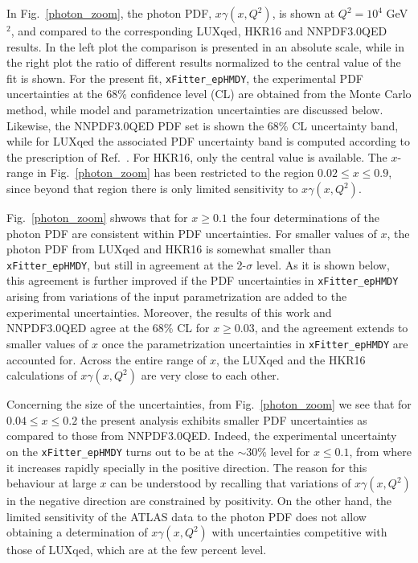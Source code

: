 In Fig.~\ref{photon_zoom}, the photon PDF, $x\gamma(x,Q^2)$, is shown at
$Q^2=10^4$ GeV$^2$,  and compared to the corresponding LUXqed,
HKR16 and NNPDF3.0QED results.
%
In the left plot the comparison is presented in an absolute scale, while
in the right plot the ratio of
different results normalized to
the central value of the fit is shown.
%
For the present fit, {\tt xFitter\_epHMDY}, 
the experimental PDF uncertainties at the 68\% confidence level (CL) are obtained from the Monte Carlo method,
 while model and parametrization uncertainties are discussed below.
Likewise, the  NNPDF3.0QED PDF set is shown the 68\% CL uncertainty band,
while for LUXqed the associated PDF uncertainty band is computed according to the
prescription of Ref.~\cite{Manohar:2016nzj}.
For HKR16, only the central value is available.
%
The $x$-range in Fig.~\ref{photon_zoom} has been restricted to the region
$0.02 \le x \le 0.9$, since beyond that region there is only limited sensitivity to $x\gamma(x,Q^2)$.

Fig.~\ref{photon_zoom} shwows that for $x\ge 0.1$ the four determinations of
the photon PDF are consistent within PDF uncertainties.
%
For smaller values of $x$, the photon PDF from LUXqed and HKR16 is somewhat smaller than {\tt xFitter\_epHMDY},
but still in agreement at the 2-$\sigma$ level.
%
As it is shown below, this agreement is further improved if the PDF uncertainties in
{\tt xFitter\_epHMDY}
arising from variations of the input parametrization are added to the experimental
uncertainties.
%
Moreover, the results of this work and NNPDF3.0QED agree at the 68\% CL for $x\ge 0.03$,
and the agreement extends to smaller values of $x$ once the parametrization
uncertainties in {\tt xFitter\_epHMDY} are accounted for.
%
Across the entire range of $x$, the LUXqed and the HKR16 calculations of $x\gamma(x,Q^2)$ are very close
to each other.

Concerning the size of the uncertainties, from Fig.~\ref{photon_zoom} we see that
for $0.04 \le x \le 0.2$ the present analysis  exhibits smaller PDF
uncertainties as compared to those from  NNPDF3.0QED.
%
Indeed, the experimental uncertainty on the {\tt xFitter\_epHMDY}
turns out to be at the  $\sim 30\%$ level for $x\le 0.1$, from where it increases
rapidly specially in the positive direction.
%
The reason for this behaviour at large $x$ can be understood by recalling that
variations of $x\gamma(x,Q^2)$ in the negative
direction are constrained by positivity.
%
On the other hand, the limited sensitivity of the ATLAS data to the photon
PDF does not allow obtaining a determination of $x\gamma(x,Q^2)$ with uncertainties
competitive with those of LUXqed, which are at the few percent level.

